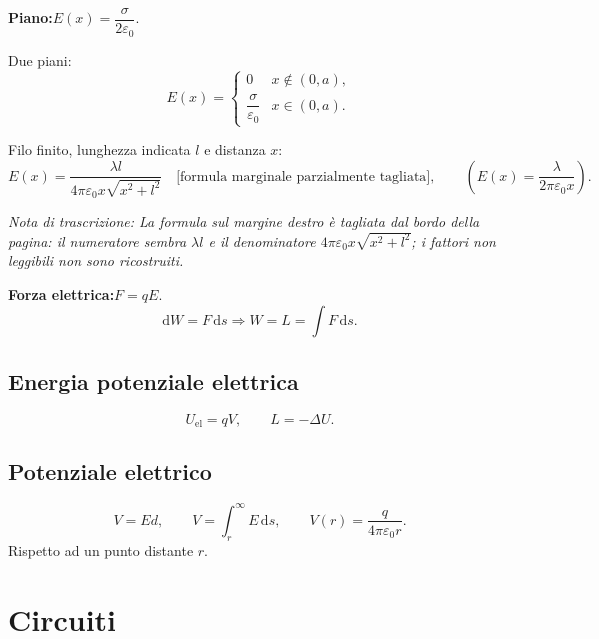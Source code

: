 \documentclass[a4paper,11pt]{article}
\newcommand{\orig}[1]{\clearpage}
\newcommand{\nota}[1]{\par\small\textit{Nota di trascrizione: #1}\par\normalsize}
\newcommand{\dd}{\mathrm{d}}
\begin{document}
\textbf{Piano:}\quad $E(x)=\dfrac\sigma{2\varepsilon_0}$.
\begin{center}\end{center}
Due piani:
\[E(x)=\begin{cases}0&x\notin(0,a),\\\dfrac\sigma{\varepsilon_0}&x\in(0,a).\end{cases}\]
\begin{center}\end{center}
Filo finito, lunghezza indicata $l$ e distanza $x$:
\[E(x)=\frac{\lambda l}{4\pi\varepsilon_0x\sqrt{x^2+l^2}}\quad\text{[formula marginale parzialmente tagliata]},\qquad
\left(E(x)=\frac\lambda{2\pi\varepsilon_0x}\right).\]
\nota{La formula sul margine destro è tagliata dal bordo della pagina: il numeratore sembra $\lambda l$ e il denominatore $4\pi\varepsilon_0x\sqrt{x^2+l^2}$; i fattori non leggibili non sono ricostruiti.}
\textbf{Forza elettrica:}\quad $F=qE$.
\[\dd W=F\,\dd s\Rightarrow W=L=\int F\,\dd s.\]
\subsection*{Energia potenziale elettrica}
\[U_{\mathrm{el}}=qV,\qquad L=-\Delta U.\]
\subsection*{Potenziale elettrico}
\[V=Ed,\qquad V=\int_r^{\infty}E\,\dd s,\qquad V(r)=\frac q{4\pi\varepsilon_0r}.\]
Rispetto ad un punto distante $r$.
\orig{10}\section*{Circuiti}
\end{document}
